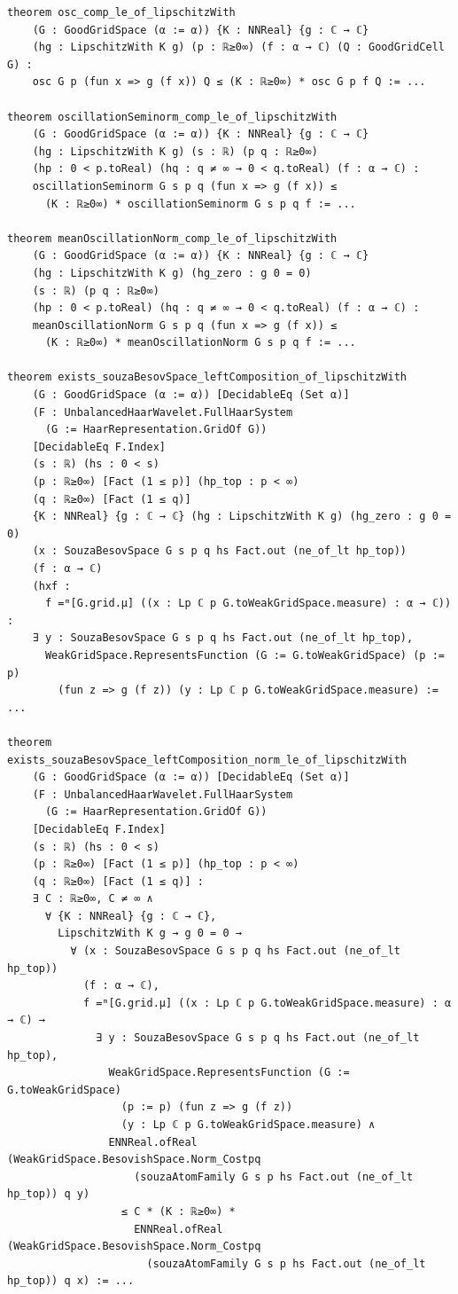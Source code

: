 \documentclass[11pt]{amsart}
\theoremstyle{definition}
\begin{document}
\begin{lstlisting}[style=lean,basicstyle=\ttfamily\scriptsize]
theorem osc_comp_le_of_lipschitzWith
    (G : GoodGridSpace (α := α)) {K : NNReal} {g : ℂ → ℂ}
    (hg : LipschitzWith K g) (p : ℝ≥0∞) (f : α → ℂ) (Q : GoodGridCell G) :
    osc G p (fun x => g (f x)) Q ≤ (K : ℝ≥0∞) * osc G p f Q := ...

theorem oscillationSeminorm_comp_le_of_lipschitzWith
    (G : GoodGridSpace (α := α)) {K : NNReal} {g : ℂ → ℂ}
    (hg : LipschitzWith K g) (s : ℝ) (p q : ℝ≥0∞)
    (hp : 0 < p.toReal) (hq : q ≠ ∞ → 0 < q.toReal) (f : α → ℂ) :
    oscillationSeminorm G s p q (fun x => g (f x)) ≤
      (K : ℝ≥0∞) * oscillationSeminorm G s p q f := ...

theorem meanOscillationNorm_comp_le_of_lipschitzWith
    (G : GoodGridSpace (α := α)) {K : NNReal} {g : ℂ → ℂ}
    (hg : LipschitzWith K g) (hg_zero : g 0 = 0)
    (s : ℝ) (p q : ℝ≥0∞)
    (hp : 0 < p.toReal) (hq : q ≠ ∞ → 0 < q.toReal) (f : α → ℂ) :
    meanOscillationNorm G s p q (fun x => g (f x)) ≤
      (K : ℝ≥0∞) * meanOscillationNorm G s p q f := ...

theorem exists_souzaBesovSpace_leftComposition_of_lipschitzWith
    (G : GoodGridSpace (α := α)) [DecidableEq (Set α)]
    (F : UnbalancedHaarWavelet.FullHaarSystem
      (G := HaarRepresentation.GridOf G))
    [DecidableEq F.Index]
    (s : ℝ) (hs : 0 < s)
    (p : ℝ≥0∞) [Fact (1 ≤ p)] (hp_top : p < ∞)
    (q : ℝ≥0∞) [Fact (1 ≤ q)]
    {K : NNReal} {g : ℂ → ℂ} (hg : LipschitzWith K g) (hg_zero : g 0 = 0)
    (x : SouzaBesovSpace G s p q hs Fact.out (ne_of_lt hp_top))
    (f : α → ℂ)
    (hxf :
      f =ᵐ[G.grid.μ] ((x : Lp ℂ p G.toWeakGridSpace.measure) : α → ℂ)) :
    ∃ y : SouzaBesovSpace G s p q hs Fact.out (ne_of_lt hp_top),
      WeakGridSpace.RepresentsFunction (G := G.toWeakGridSpace) (p := p)
        (fun z => g (f z)) (y : Lp ℂ p G.toWeakGridSpace.measure) := ...

theorem exists_souzaBesovSpace_leftComposition_norm_le_of_lipschitzWith
    (G : GoodGridSpace (α := α)) [DecidableEq (Set α)]
    (F : UnbalancedHaarWavelet.FullHaarSystem
      (G := HaarRepresentation.GridOf G))
    [DecidableEq F.Index]
    (s : ℝ) (hs : 0 < s)
    (p : ℝ≥0∞) [Fact (1 ≤ p)] (hp_top : p < ∞)
    (q : ℝ≥0∞) [Fact (1 ≤ q)] :
    ∃ C : ℝ≥0∞, C ≠ ∞ ∧
      ∀ {K : NNReal} {g : ℂ → ℂ},
        LipschitzWith K g → g 0 = 0 →
          ∀ (x : SouzaBesovSpace G s p q hs Fact.out (ne_of_lt hp_top))
            (f : α → ℂ),
            f =ᵐ[G.grid.μ] ((x : Lp ℂ p G.toWeakGridSpace.measure) : α → ℂ) →
              ∃ y : SouzaBesovSpace G s p q hs Fact.out (ne_of_lt hp_top),
                WeakGridSpace.RepresentsFunction (G := G.toWeakGridSpace)
                  (p := p) (fun z => g (f z))
                  (y : Lp ℂ p G.toWeakGridSpace.measure) ∧
                ENNReal.ofReal (WeakGridSpace.BesovishSpace.Norm_Costpq
                    (souzaAtomFamily G s p hs Fact.out (ne_of_lt hp_top)) q y)
                  ≤ C * (K : ℝ≥0∞) *
                    ENNReal.ofReal (WeakGridSpace.BesovishSpace.Norm_Costpq
                      (souzaAtomFamily G s p hs Fact.out (ne_of_lt hp_top)) q x) := ...
\end{lstlisting}
\end{document}
